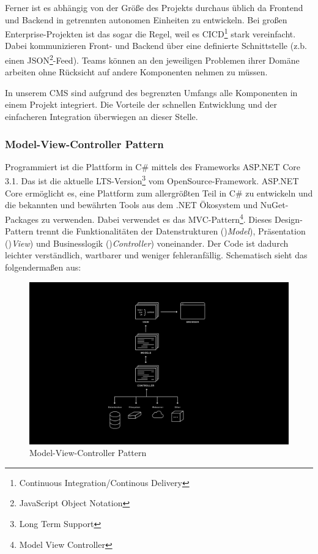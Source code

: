 \documentclass[titlepage, a4paper, 11pt]{scrartcl}
\begin{document}
      Ferner ist es abhängig von der Größe des Projekts durchaus üblich da Frontend und Backend in getrennten autonomen Einheiten zu entwickeln. 
      Bei großen Enterprise-Projekten ist das sogar die Regel, weil es CICD\footnote{Continuous Integration/Continous Delivery} stark vereinfacht.
      Dabei kommunizieren Front- und Backend über eine definierte Schnittstelle (z.b. einen JSON\footnote{JavaScript Object Notation}-Feed).
      Teams können an den jeweiligen Problemen ihrer Domäne arbeiten ohne Rücksicht auf andere Komponenten nehmen zu müssen.

      In unserem CMS sind aufgrund des begrenzten Umfangs alle Komponenten in einem Projekt integriert. 
      Die Vorteile der schnellen Entwicklung und der einfacheren Integration überwiegen an dieser Stelle.

      \subsubsection{Model-View-Controller Pattern}

        Programmiert ist die Plattform in C\# mittels des Frameworks ASP.NET Core 3.1. Das ist die aktuelle LTS-Version\footnote{Long Term Support} vom OpenSource-Framework.
        ASP.NET Core ermöglicht es, eine Plattform zum allergrößten Teil in C\# zu entwickeln und die bekannten und bewährten Tools aus dem .NET Ökosystem und NuGet-Packages zu verwenden.
        Dabei verwendet es das MVC-Pattern\footnote{Model View Controller}. Dieses Design-Pattern trennt die Funktionalitäten der Datenstrukturen ()\textit{Model}), Präsentation ()\textit{View})
        und Businesslogik ()\textit{Controller}) voneinander. Der Code ist dadurch leichter verständlich, wartbarer und weniger fehleranfällig. Schematisch sieht das folgendermaßen aus:

        \begin{figure}[H]
          \centering
          \includegraphics[width=.8\textwidth]{MVC.png}
          \caption{Model-View-Controller Pattern}
          \label{MVC}
        \end{figure}
        
\end{document}
